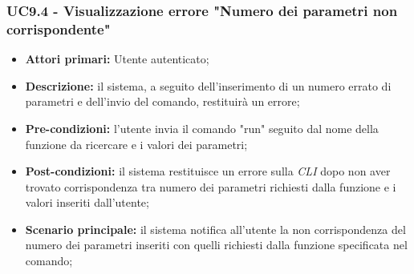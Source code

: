 \subsubsection{UC9.4 - Visualizzazione errore "Numero dei parametri non corrispondente"}
\begin{itemize}
	\item \textbf{Attori primari:} Utente autenticato;
	\item \textbf{Descrizione:} il sistema, a seguito dell'inserimento di un numero errato di parametri e dell'invio del comando, restituirà un errore; 
	\item \textbf{Pre-condizioni:} l'utente invia il comando "run" seguito dal nome della funzione da ricercare e i valori dei parametri;
	\item \textbf{Post-condizioni:} il sistema restituisce un errore sulla \textit{CLI\glo} dopo non aver trovato corrispondenza tra numero dei parametri richiesti dalla funzione e i valori inseriti dall'utente;
	\item \textbf{Scenario principale:} il sistema notifica all'utente la non corrispondenza del numero dei parametri inseriti con quelli richiesti dalla funzione specificata nel comando;
\end{itemize}

